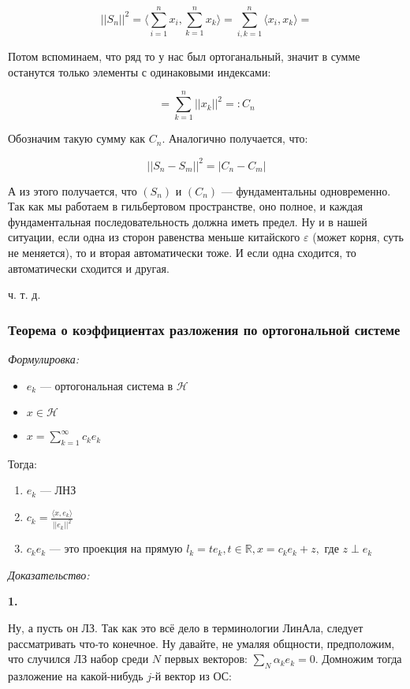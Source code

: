 \documentclass{article}
\def\sk#1#2{\langle #1, #2 \rangle}
\begin{document}
\[||S_n||^2 = \sk{\sum_{i = 1}^n x_i}{\sum_{k = 1}^n x_k} = \sum_{i, k = 1}^n \sk{x_i}{x_k} =\]

Потом вспоминаем, что ряд то у нас был ортоганальный, значит в сумме останутся только элементы с одинаковыми индексами:

\[=\sum_{k = 1}^{n} ||x_k||^2 =: C_n\]

Обозначим такую сумму как $C_n$. Аналогично получается, что:

\[||S_n - S_m||^2 = |C_n - C_m|\]

А из этого получается, что $(S_n)$ и $(C_n)$ --- фундаментальны одновременно. Так как мы работаем в гильбертовом пространстве, оно полное, и каждая фундаментальная последовательность должна иметь предел. Ну и в нашей ситуации, если одна из сторон равенства меньше китайского $\varepsilon$ (может корня, суть не меняется), то и вторая автоматически тоже. И если одна сходится, то автоматически сходится и другая.

ч. т. д. 

\subsubsection{Теорема о коэффициентах разложения по ортогональной системе}
\textit{Формулировка:}

\begin{itemize}
    \item ${e_k}$ --- ортогональная система в $\mathcal{H}$
    \item $x \in \mathcal{H}$
    \item $x = \sum_{k = 1}^{\infty} c_k e_k$
\end{itemize}

Тогда:

\begin{enumerate}
    \item ${e_k}$ --- ЛНЗ
    \item $c_k = \frac{\langle x, e_k \rangle}{||e_k||^2}$
    \item $c_ke_k$ --- это проекция на прямую $l_k = {te_k, t \in \mathbb{R}}, x = c_ke_k + z, $ где $z \perp e_k$
\end{enumerate}

\textit{Доказательство:}

\textbf{1.}

Ну, а пусть он ЛЗ. Так как это всё дело в терминологии ЛинАла, следует рассматривать что-то конечное. Ну давайте, не умаляя общности, предположим, что случился ЛЗ набор среди $N$ первых векторов: $\sum_N \alpha_k e_k = 0$. Домножим тогда разложение на какой-нибудь $j$-й вектор из ОС:
\end{document}
